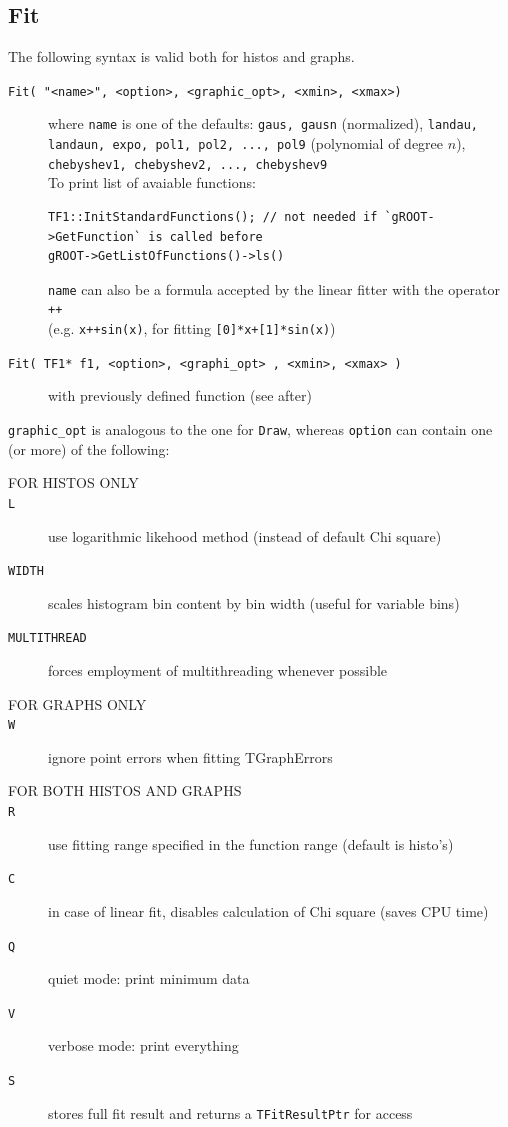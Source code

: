 \documentclass[10pt, oneside]{article}
\begin{document}
\subsection{Fit}
The following syntax is valid both for histos and graphs.
\begin{description}
\item[\texttt{Fit( "<name>", <option>, <graphic\_opt>, <xmin>, <xmax>)}] where \texttt{name} is one of the defaults: \texttt{gaus, gausn} (normalized), \texttt{landau, landaun, expo, pol1, pol2, ..., pol9} (polynomial of degree $n$), \texttt{chebyshev1, chebyshev2, ..., chebyshev9}\\
To print list of avaiable functions: \begin{verbatim}
TF1::InitStandardFunctions(); // not needed if `gROOT->GetFunction` is called before
gROOT->GetListOfFunctions()->ls()
\end{verbatim}
\texttt{name} can also be a formula accepted by the linear fitter with the operator \texttt{++}\\
(e.g. \texttt{x++sin(x)}, for fitting \texttt{[0]*x+[1]*sin(x)})
\item[\texttt{Fit( TF1* f1, <option>, <graphi\_opt> , <xmin>, <xmax> )}] with previously defined function (see after)
\end{description}
\texttt{graphic\_opt} is analogous to the one for \texttt{Draw}, whereas \texttt{option} can contain one (or more) of the following:
\begin{description}
\item[FOR HISTOS ONLY]
\item[\texttt{L}] use logarithmic likehood method (instead of default Chi square)

\item[\texttt{WIDTH}] scales histogram bin content by bin width (useful for variable bins)
\item[\texttt{MULTITHREAD}] forces employment of multithreading whenever possible
\item[FOR GRAPHS ONLY]
\item[\texttt{W}] ignore point errors when fitting TGraphErrors
\item[FOR BOTH HISTOS AND GRAPHS]
\item[\texttt{R}] use fitting range specified in the function range (default is histo's)
\item[\texttt{C}] in case of linear fit, disables calculation of Chi square (saves CPU time)
\item[\texttt{Q}] quiet mode: print minimum data
\item[\texttt{V}] verbose mode: print everything
\item[\texttt{S}] stores full fit result and returns a \texttt{TFitResultPtr} for access
\end{description}
\end{document}
